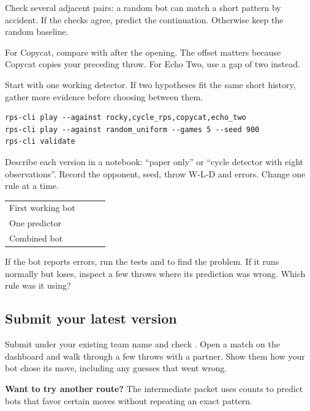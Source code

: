 \documentclass[11pt]{article}
\begin{document}
Check several adjacent pairs: a random bot can match a short pattern by accident. If the checks agree, predict the continuation. Otherwise keep the random baseline.


For Copycat, compare  with  after the opening. The offset matters because Copycat copies your preceding throw. For Echo Two, use a gap of two instead.


Start with one working detector. If two hypotheses fit the same short history, gather more evidence before choosing between them.



\begin{lstlisting}[style=shell]
rps-cli play --against rocky,cycle_rps,copycat,echo_two
rps-cli play --against random_uniform --games 5 --seed 900
rps-cli validate
\end{lstlisting}

Describe each version in a notebook: \enquote{paper only} or \enquote{cycle detector with eight observations}. Record the opponent, seed, throw W-L-D and errors. Change one rule at a time.


\smallskip\begingroup\small
\setlength{\tabcolsep}{5pt}
\renewcommand{\arraystretch}{1.17}
\begin{tabularx}{\linewidth}{@{}L{.25\linewidth}YYY@{}}
\toprule
{} &  &  &  \\
\midrule
\rule{0pt}{22pt}First working bot &  &  &  \\
\rule{0pt}{22pt}One predictor &  &  &  \\
\rule{0pt}{22pt}Combined bot &  &  &  \\
\bottomrule
\end{tabularx}\endgroup\par\smallskip

If the bot reports errors, run the tests and  to find the problem. If it runs normally but loses, inspect a few throws where its prediction was wrong. Which rule was it using?


\subsection*{Submit your latest version}

Submit under your existing team name and check . Open a match on the dashboard and walk through a few throws with a partner. Show them how your bot chose its move, including any guesses that went wrong.


\textbf{Want to try another route?} The intermediate packet uses counts to predict bots that favor certain moves without repeating an exact pattern.
\par
\end{document}
